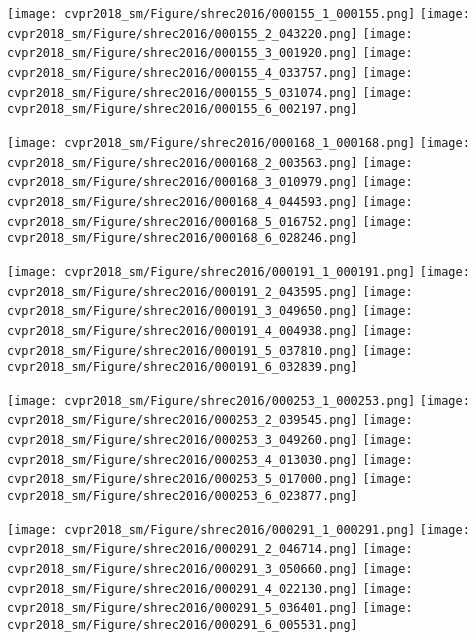 \documentclass[10pt,twocolumn,letterpaper]{article}
\begin{document}
\begin{figure*}[h]
        \texttt{[image: cvpr2018\_sm/Figure/shrec2016/000155\_1\_000155.png]}
        \texttt{[image: cvpr2018\_sm/Figure/shrec2016/000155\_2\_043220.png]}
        \texttt{[image: cvpr2018\_sm/Figure/shrec2016/000155\_3\_001920.png]}
        \texttt{[image: cvpr2018\_sm/Figure/shrec2016/000155\_4\_033757.png]}
        \texttt{[image: cvpr2018\_sm/Figure/shrec2016/000155\_5\_031074.png]}
        \texttt{[image: cvpr2018\_sm/Figure/shrec2016/000155\_6\_002197.png]}
        
        \texttt{[image: cvpr2018\_sm/Figure/shrec2016/000168\_1\_000168.png]}
        \texttt{[image: cvpr2018\_sm/Figure/shrec2016/000168\_2\_003563.png]}
        \texttt{[image: cvpr2018\_sm/Figure/shrec2016/000168\_3\_010979.png]}
        \texttt{[image: cvpr2018\_sm/Figure/shrec2016/000168\_4\_044593.png]}
        \texttt{[image: cvpr2018\_sm/Figure/shrec2016/000168\_5\_016752.png]}
        \texttt{[image: cvpr2018\_sm/Figure/shrec2016/000168\_6\_028246.png]}
        
        \texttt{[image: cvpr2018\_sm/Figure/shrec2016/000191\_1\_000191.png]}
        \texttt{[image: cvpr2018\_sm/Figure/shrec2016/000191\_2\_043595.png]}
        \texttt{[image: cvpr2018\_sm/Figure/shrec2016/000191\_3\_049650.png]}
        \texttt{[image: cvpr2018\_sm/Figure/shrec2016/000191\_4\_004938.png]}
        \texttt{[image: cvpr2018\_sm/Figure/shrec2016/000191\_5\_037810.png]}
        \texttt{[image: cvpr2018\_sm/Figure/shrec2016/000191\_6\_032839.png]}
        
        \texttt{[image: cvpr2018\_sm/Figure/shrec2016/000253\_1\_000253.png]}
        \texttt{[image: cvpr2018\_sm/Figure/shrec2016/000253\_2\_039545.png]}
        \texttt{[image: cvpr2018\_sm/Figure/shrec2016/000253\_3\_049260.png]}
        \texttt{[image: cvpr2018\_sm/Figure/shrec2016/000253\_4\_013030.png]}
        \texttt{[image: cvpr2018\_sm/Figure/shrec2016/000253\_5\_017000.png]}
        \texttt{[image: cvpr2018\_sm/Figure/shrec2016/000253\_6\_023877.png]}
        
        \texttt{[image: cvpr2018\_sm/Figure/shrec2016/000291\_1\_000291.png]}
        \texttt{[image: cvpr2018\_sm/Figure/shrec2016/000291\_2\_046714.png]}
        \texttt{[image: cvpr2018\_sm/Figure/shrec2016/000291\_3\_050660.png]}
        \texttt{[image: cvpr2018\_sm/Figure/shrec2016/000291\_4\_022130.png]}
        \texttt{[image: cvpr2018\_sm/Figure/shrec2016/000291\_5\_036401.png]}
        \texttt{[image: cvpr2018\_sm/Figure/shrec2016/000291\_6\_005531.png]}
        

\end{figure*}
\end{document}
